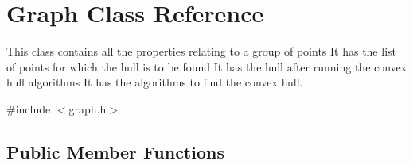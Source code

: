 \hypertarget{classGraph}{}\section{Graph Class Reference}
\label{classGraph}


This class contains all the properties relating to a group of points It has the list of points for which the hull is to be found It has the hull after running the convex hull algorithms It has the algorithms to find the convex hull.  




{\ttfamily \#include $<$graph.\+h$>$}

\subsection*{Public Member Functions}
